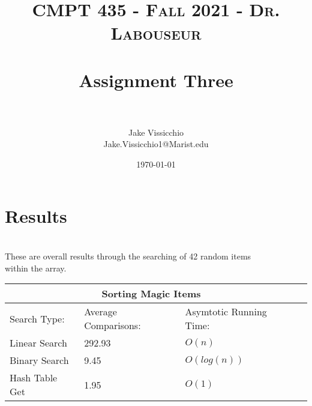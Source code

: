 \documentclass[letterpaper, 10pt]{article}
\title{	
   \normalfont\normalsize 
   \textsc{CMPT 435 - Fall 2021 - Dr. Labouseur} \\[10pt] %
   \horrule{0.5pt} \\[0.25cm] 	%
   \huge Assignment Three \\   %
   \horrule{0.5pt} \\[0.25cm] 	%
}
\author{Jake Vissicchio \\ \normalsize Jake.Vissicchio1@Marist.edu}
\date{\normalsize\today} 	%
\begin{document}
\maketitle %



\section{Results}

\noindent
\\
These are overall results through the searching of 42 random items\\
within the array.
\\

\begin{tabular}{ |p{4cm}||p{4cm}|p{4cm}|p{4cm}|  }
 \hline
 \multicolumn{3}{|c|}{Sorting Magic Items} \\
 \hline
 Search Type: & Average Comparisons: & Asymtotic Running Time: \\
 \hline
Linear Search   &  292.93    & $O(n)$\\

Binary Search &   9.45 & $O(log(n))$   \\

Hash Table Get & 1.95 & $O(1)$ \\
 \hline
\end{tabular}
\\
\end{document}
